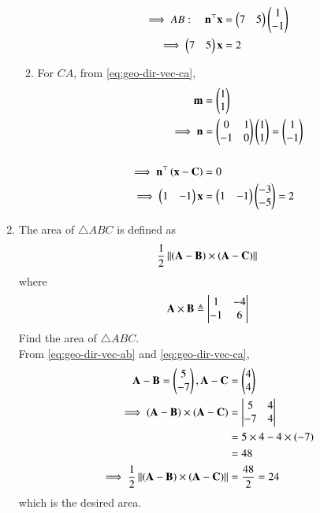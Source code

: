 \begin{enumerate}[label=\thesubsection.\arabic*.,ref=\thesubsection.\theenumi]
\begin{enumerate}
\begin{align}
	\implies
                AB: \quad  \mathbf{n}^{\top}\mathbf{x} &= \begin{pmatrix}7&5\end{pmatrix}\begin{pmatrix}1\\-1\end{pmatrix}\\    
       \implies\begin{pmatrix}7&5\end{pmatrix}\mathbf{x} &= 2
\end{align}
\item For 
$CA$, 
from 
		\eqref{eq:geo-dir-vec-ca}, 
\begin{align}
\mathbf{m} &= \begin{pmatrix}1 \\ 1\end{pmatrix}
\\
		\label{eq:geo-norm-vec-ca}
\implies \mathbf{n} 
&= \begin{pmatrix}0&1 \\ -1&0\end{pmatrix}\begin{pmatrix}1 \\ 1\end{pmatrix}
= \begin{pmatrix}1 \\ -1\end{pmatrix}\\
\\
\implies	\mathbf{n}^{\top}\left(	\mathbf{x}-\mathbf{C}\right) &= 0
\\
\implies \begin{pmatrix}1&-1\end{pmatrix}{\mathbf{x}} &= \begin{pmatrix}1&-1\end{pmatrix}\begin{pmatrix}-3 \\ -5\end{pmatrix} 
= 2 
\end{align}
\end{enumerate}

%
\item The area of $\triangle ABC$ is defined as
		\begin{align}
			\label{eq:tri-area-cross}
			\frac{1}{2}\left\lVert{\ensuremath{\left(\mathbf{A}-\mathbf{B}\right)}\times \ensuremath{\left(\mathbf{A}-\mathbf{C}\right)}}\right\rVert
		\end{align}
		where
		\begin{align}
			\mathbf{A}\times\mathbf{B} \triangleq \begin{vmatrix}1 & -4 \\-1 & 6\end{vmatrix}
		\end{align}
		Find the area of $\triangle ABC$.\\
\solution
From
		\eqref{eq:geo-dir-vec-ab}
		and
		\eqref{eq:geo-dir-vec-ca},
\begin{align}
	\mathbf{A}-\mathbf{B}=\begin{pmatrix}5\\-7\end{pmatrix},
	\mathbf{A}-\mathbf{C}&=\begin{pmatrix}4\\4\end{pmatrix}\\
\implies (\mathbf{A}-\mathbf{B})\times(\mathbf{A}-\mathbf{C}) &=\begin{vmatrix}5 & 4\\-7 & 4\end{vmatrix}\\
&=5\times 4-4\times (-7)\\&=48\\
\implies\frac{1}{2}\left\lVert(\mathbf{A}-\mathbf{B})\times(\mathbf{A}-\mathbf{C})\right\rVert&=\frac{48}{2}=24
\end{align}
which is the desired area.


\end{enumerate}
